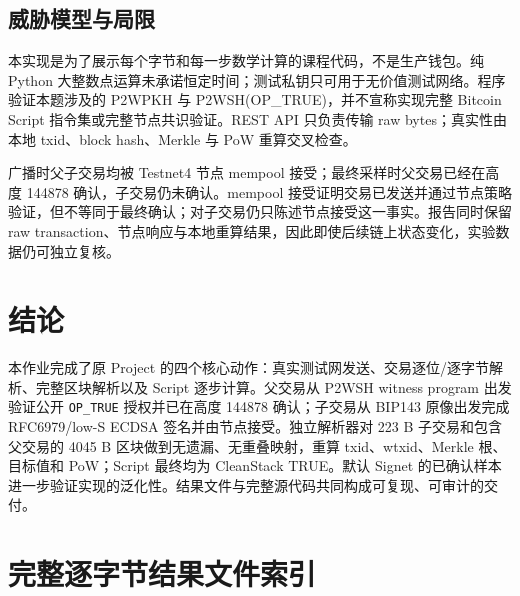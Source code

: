 \documentclass[UTF8,a4paper,zihao=-4]{ctexart}
\begin{document}
\subsection{威胁模型与局限}

\begin{warningbox}[边界说明]
本实现是为了展示每个字节和每一步数学计算的课程代码，不是生产钱包。纯 Python 大整数点运算未承诺恒定时间；测试私钥只可用于无价值测试网络。程序验证本题涉及的 P2WPKH 与 P2WSH(OP\_TRUE)，并不宣称实现完整 Bitcoin Script 指令集或完整节点共识验证。REST API 只负责传输 raw bytes；真实性由本地 txid、block hash、Merkle 与 PoW 重算交叉检查。
\end{warningbox}

广播时父子交易均被 Testnet4 节点 mempool 接受；最终采样时父交易已经在高度 144878 确认，子交易仍未确认。mempool 接受证明交易已发送并通过节点策略验证，但不等同于最终确认；对子交易仍只陈述节点接受这一事实。报告同时保留 raw transaction、节点响应与本地重算结果，因此即使后续链上状态变化，实验数据仍可独立复核。

\section{结论}

本作业完成了原 Project 的四个核心动作：真实测试网发送、交易逐位/逐字节解析、完整区块解析以及 Script 逐步计算。父交易从 P2WSH witness program 出发验证公开 \texttt{OP\_TRUE} 授权并已在高度 144878 确认；子交易从 BIP143 原像出发完成 RFC6979/low-S ECDSA 签名并由节点接受。独立解析器对 223 B 子交易和包含父交易的 4045 B 区块做到无遗漏、无重叠映射，重算 txid、wtxid、Merkle 根、目标值和 PoW；Script 最终均为 CleanStack TRUE。默认 Signet 的已确认样本进一步验证实现的泛化性。结果文件与完整源代码共同构成可复现、可审计的交付。

\clearpage
\appendix
\section{完整逐字节结果文件索引}
\end{document}
